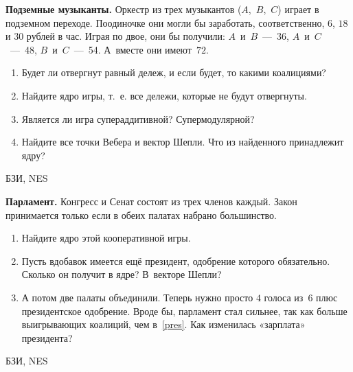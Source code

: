 \begin{problem}
 {\bf Подземные музыканты.} Оркестр из трех музыкантов
($A$,~$B$,~$C$) играет в подземном переходе. Поодиночке они
могли бы заработать, соответственно, $6$, $18$ и $30$
рублей в час. Играя по двое, они бы получили:
$A$~и~$B$~---~36, $A$~и~$C$~---~48, $B$~и~$C$~---~54.
А~вместе они имеют~$72$.

\begin{enumerate}

\item Будет ли отвергнут равный дележ, и если будет, то
какими коалициями?

\item Найдите ядро игры, т.~е. все дележи, которые не будут
отвергнуты.

\item Является ли игра супераддитивной? Супермодулярной?

\item Найдите все точки Вебера и вектор Шепли. Что из
найденного принадлежит ядру?

\end{enumerate}




\begin{source}
БЗИ, NES
\end{source}


\begin{sol}

\end{sol}
\end{problem}





\begin{problem}
 {\bf Парламент.} Конгресс и Сенат состоят из трех
членов каждый. Закон принимается только если в обеих
палатах набрано большинство.

\begin{enumerate}

\item Найдите ядро этой кооперативной игры.

\item\label{pres} Пусть вдобавок имеется ещё президент,
одобрение которого обязательно. Сколько он получит в ядре?
В~векторе Шепли?

\item А потом две палаты объединили. Теперь нужно просто
$4$ голоса из~$6$ плюс президентское одобрение. Вроде бы,
парламент стал сильнее, так как больше выигрывающих
коалиций, чем в~\ref{pres}. Как изменилась «зарплата»
президента?

\end{enumerate}




\begin{source}
БЗИ, NES
\end{source}


\begin{sol}

\end{sol}
\end{problem}





